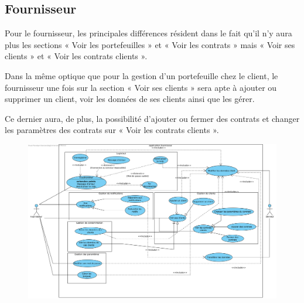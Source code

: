 \newpage

\subsection{Fournisseur}

Pour le fournisseur, les principales différences résident dans le fait qu’il n’y aura plus les sections « Voir les portefeuilles » et « Voir les contrats » mais « Voir ses clients » et « Voir les contrats clients ».

\newline

\begin{flushleft}
Dans la même optique que pour la gestion d’un portefeuille chez le client, le fournisseur une fois sur la section « Voir ses clients » sera apte à ajouter ou supprimer un client, voir les données de ses clients ainsi que les gérer.
\end{flushleft}
\newline
\newline

\begin{flushleft}
Ce dernier aura, de plus, la possibilité d’ajouter ou fermer des contrats et changer les paramètres des contrats sur « Voir les contrats clients ».
\end{flushleft}

\begin{figure}[h]
\centering
\includegraphics[width = 1\textwidth]{use_case/fournisseur.png}
\end{figure}
